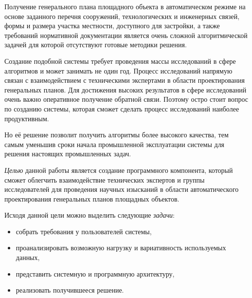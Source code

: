 Получение генерального плана площадного объекта в автоматическом режиме на основе
заданного перечня сооружений, технологических и инженерных связей,
формы и размера участка местности, доступного для застройки, а также требований нормативной документации является очень
сложной алгоритмической задачей для которой отсутствуют готовые методики решения.

Создание подобной системы требует проведения массы исследований в сфере алгоритмов
и может занимать не один год. Процесс исследований напрямую связан с взаимодействием с техническими экспертами
в области проектирования генеральных планов.
Для достижения высоких результатов в сфере исследований очень важно оперативное получение обратной связи.
Поэтому остро стоит вопрос по созданию системы, которая сможет сделать процесс исследований наиболее продуктивным.

Но её решение позволит получить алгоритмы более высокого качества,
тем самым уменьшив сроки начала промышленной эксплуатации системы
для решения настоящих промышленных задач.


\textit{Целью} данной работы является создание программного компонента,
который сможет облегчить взаимодействие технических экспертов
и группы исследователей для проведения научных изысканий
в области автоматического проектирования генеральных планов площадных объектов.

Исходя данной цели можно выделить следующие \textit{задачи}:
\begin{itemize}
    \item собрать требования у пользователей системы,
    \item проанализировать возможную нагрузку и вариативность используемых данных,
    \item представить системную и программную архитектуру,
    \item реализовать получившееся решение.
\end{itemize}
